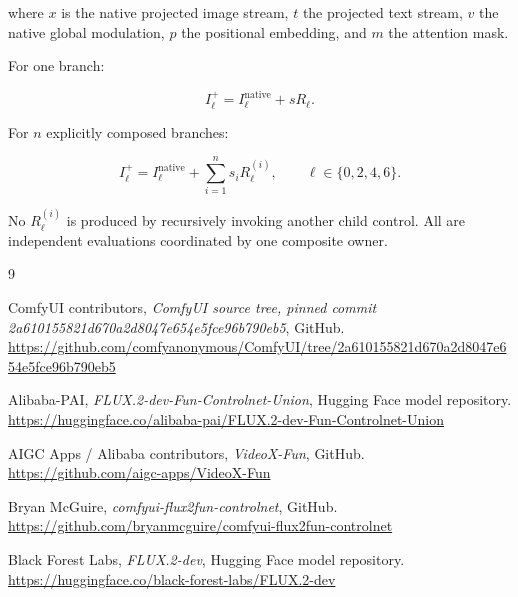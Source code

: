 \documentclass[11pt]{article}
\begin{document}
where $x$ is the native projected image stream, $t$ the projected text stream, $v$ the native global modulation, $p$ the positional embedding, and $m$ the attention mask.

For one branch:

\[
  I_{\ell}^{+}=I_{\ell}^{\mathrm{native}}+sR_{\ell}.
\]

For $n$ explicitly composed branches:

\[
  I_{\ell}^{+}
  = I_{\ell}^{\mathrm{native}}
  + \sum_{i=1}^{n}s_iR_{\ell}^{(i)},
  \qquad \ell\in\{0,2,4,6\}.
\]

No $R_{\ell}^{(i)}$ is produced by recursively invoking another child control. All are independent evaluations coordinated by one composite owner.

\begin{thebibliography}{9}

ComfyUI contributors,
\emph{ComfyUI source tree, pinned commit 2a610155821d670a2d8047e654e5fce96b790eb5},
GitHub.
\url{https://github.com/comfyanonymous/ComfyUI/tree/2a610155821d670a2d8047e654e5fce96b790eb5}

Alibaba-PAI,
\emph{FLUX.2-dev-Fun-Controlnet-Union},
Hugging Face model repository.
\url{https://huggingface.co/alibaba-pai/FLUX.2-dev-Fun-Controlnet-Union}

AIGC Apps / Alibaba contributors,
\emph{VideoX-Fun},
GitHub.
\url{https://github.com/aigc-apps/VideoX-Fun}

Bryan McGuire,
\emph{comfyui-flux2fun-controlnet},
GitHub.
\url{https://github.com/bryanmcguire/comfyui-flux2fun-controlnet}

Black Forest Labs,
\emph{FLUX.2-dev},
Hugging Face model repository.
\url{https://huggingface.co/black-forest-labs/FLUX.2-dev}

\end{thebibliography}
\end{document}

